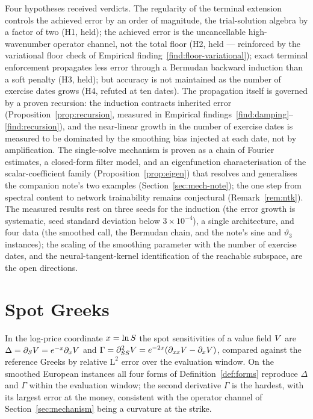 \documentclass[11pt]{article}
\theoremstyle{plain}
\theoremstyle{definition}
\theoremstyle{remark}
\begin{document}
Four hypotheses received verdicts. The regularity of the terminal extension
controls the achieved error by an order of magnitude, the trial-solution algebra
by a factor of two (H1, held); the achieved error is the uncancellable
high-wavenumber operator channel, not the total floor (H2, held --- reinforced by
the variational floor check of Empirical finding~\ref{find:floor-variational});
exact terminal enforcement propagates less error through a Bermudan backward
induction than a soft penalty (H3, held); but accuracy is not maintained as the
number of exercise dates grows (H4, refuted at ten dates). The propagation itself
is governed by a proven recursion: the induction contracts inherited error
(Proposition~\ref{prop:recursion}, measured in Empirical
findings~\ref{find:damping}--\ref{find:recursion}), and the near-linear growth in
the number of exercise dates is measured to be dominated by the smoothing bias
injected at each date, not by amplification. The single-solve mechanism is proven
as a chain of Fourier estimates, a closed-form filter model, and an eigenfunction
characterisation of the scalar-coefficient family (Proposition~\ref{prop:eigen})
that resolves and generalises the companion note's two examples
(Section~\ref{sec:mech-note}); the one step from spectral content to network
trainability remains conjectural (Remark~\ref{rem:ntk}). The measured results
rest on three seeds for the induction (the error growth is systematic, seed
standard deviation below $3\times10^{-4}$), a single architecture, and four data
(the smoothed call, the Bermudan chain, and the note's sine and $\vartheta_3$
instances); the scaling of the smoothing parameter with the number of exercise
dates, and the neural-tangent-kernel identification of the reachable subspace,
are the open directions.

\appendix
\section{Spot Greeks}\label{app:greeks}

In the log-price coordinate $x=\ln S$ the spot sensitivities of a
value field $V$ are $\Delta=\partial_{S}V=e^{-x}\partial_{x}V$
and $\Gamma=\partial^{2}_{SS}V=e^{-2x}(\partial_{xx}V-\partial_{x}V)$,
compared against the reference Greeks by relative $\mathrm{L}^{2}$ error over the
evaluation window. On the smoothed European instances all four forms of
Definition~\ref{def:forms} reproduce $\Delta$ and $\Gamma$ within the evaluation
window; the second derivative $\Gamma$ is the hardest, with its largest error at
the money, consistent with the operator channel of Section~\ref{sec:mechanism}
being a curvature at the strike.
\end{document}
